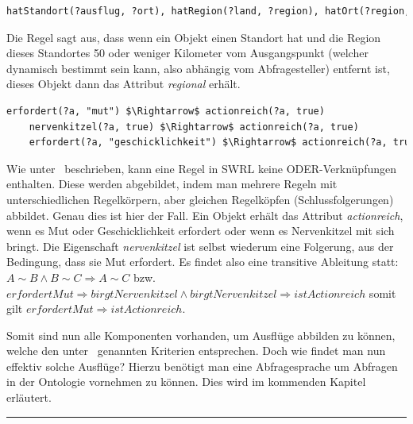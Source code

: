 \begin{lstlisting}[caption={Beispiel der SWRL-regel für die Eigenschaft \textit{regional}},captionpos=b,language=xml]
    hatStandort(?ausflug, ?ort), hatRegion(?land, ?region), hatOrt(?region, ?ort), distanzZuAusgangspunkt(?region, ?distanz), swrldb:lessThanOrEqual(?distanz, 50) $\Rightarrow$ regional(?ausflug, true)
\end{lstlisting}

Die Regel sagt aus, dass wenn ein Objekt einen Standort hat und die Region dieses Standortes 50 oder weniger Kilometer vom Ausgangspunkt (welcher dynamisch bestimmt sein kann, also abhängig vom Abfragesteller) entfernt ist, dieses Objekt dann das Attribut \textit{regional} erhält.

\begin{lstlisting}[caption={Beispiel der SWRL-Regel für die Eigenschaft \textit{actionreich}},captionpos=b,language=XML]
    erfordert(?a, "mut") $\Rightarrow$ actionreich(?a, true)
    nervenkitzel(?a, true) $\Rightarrow$ actionreich(?a, true)
    erfordert(?a, "geschicklichkeit") $\Rightarrow$ actionreich(?a, true)
\end{lstlisting}

Wie unter~ beschrieben, kann eine Regel in SWRL keine ODER-Verknüpfungen enthalten. Diese werden abgebildet, indem man mehrere Regeln mit unterschiedlichen Regelkörpern, aber gleichen Regelköpfen (Schlussfolgerungen) abbildet. Genau dies ist hier der Fall. Ein Objekt erhält das Attribut \textit{actionreich}, wenn es Mut oder Geschicklichkeit erfordert oder wenn es Nervenkitzel mit sich bringt. Die Eigenschaft \textit{nervenkitzel} ist selbst wiederum eine Folgerung, aus der Bedingung, dass sie Mut erfordert. Es findet also eine transitive Ableitung statt: $A \sim B \wedge B \sim C \Rightarrow A \sim C$ bzw. $erfordertMut \Rightarrow birgtNervenkitzel \wedge birgtNervenkitzel \Rightarrow istActionreich$ somit gilt $erfordertMut \Rightarrow istActionreich$.

Somit sind nun alle Komponenten vorhanden, um Ausflüge abbilden zu können, welche den unter~\hyperref[elephant_graph_data]{} genannten Kriterien entsprechen. Doch wie findet man nun effektiv solche Ausflüge? Hierzu benötigt man eine Abfragesprache um Abfragen in der Ontologie vornehmen zu können. Dies wird im kommenden Kapitel erläutert.

\noindent\rule[1ex]{\textwidth}{1pt}
